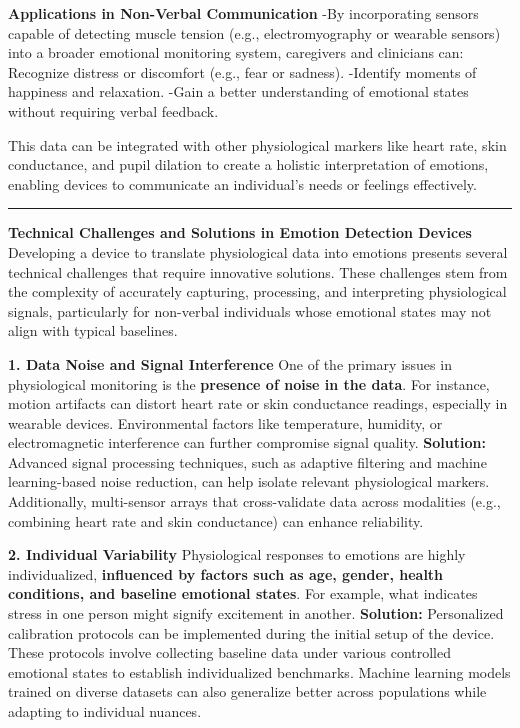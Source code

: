\documentclass[12pt, research paper]{report}
\begin{document}
	\noindent \textbf{Applications in Non-Verbal Communication}
	\newline -By incorporating sensors capable of detecting muscle tension (e.g., electromyography or wearable sensors) into a broader emotional monitoring system, caregivers and clinicians can:
	Recognize distress or discomfort (e.g., fear or sadness).
	\newline -Identify moments of happiness and relaxation.
	\newline -Gain a better understanding of emotional states without requiring verbal feedback.
	\bigskip 
	
	\noindent This data can be integrated with other physiological markers like heart rate, skin conductance, and pupil dilation to create a holistic interpretation of emotions, enabling devices to communicate an individual's needs or feelings effectively.
	
	\noindent \rule{13.85cm}{0.01cm}
	\newline \textbf{Technical Challenges and Solutions in Emotion Detection Devices}
	\newline Developing a device to translate physiological data into emotions presents several technical challenges that require innovative solutions. These challenges stem from the complexity of accurately capturing, processing, and interpreting physiological signals, particularly for non-verbal individuals whose emotional states may not align with typical baselines.
	\bigskip
	
	\noindent \textbf{1. Data Noise and Signal Interference}
	\newline One of the primary issues in physiological monitoring is the \textbf{presence of noise in the data}. For instance, motion artifacts can distort heart rate or skin conductance readings, especially in wearable devices. Environmental factors like temperature, humidity, or electromagnetic interference can further compromise signal quality.
	\newline \textbf{Solution:} Advanced signal processing techniques, such as adaptive filtering and machine learning-based noise reduction, can help isolate relevant physiological markers. Additionally, multi-sensor arrays that cross-validate data across modalities (e.g., combining heart rate and skin conductance) can enhance reliability.
	\bigskip 
	
	\noindent \textbf{2. Individual Variability}
	\newline Physiological responses to emotions are highly individualized, \textbf{influenced by factors such as age, gender, health conditions, and baseline emotional states}. For example, what indicates stress in one person might signify excitement in another.
	\newline \textbf{Solution:} Personalized calibration protocols can be implemented during the initial setup of the device. These protocols involve collecting baseline data under various controlled emotional states to establish individualized benchmarks. Machine learning models trained on diverse datasets can also generalize better across populations while adapting to individual nuances.
	\bigskip
	
\end{document}
